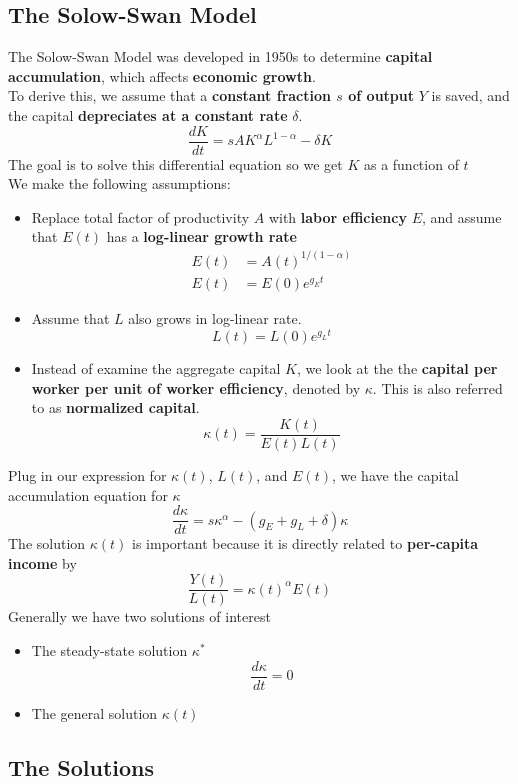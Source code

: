 \documentclass[a4paper]{article}
\renewcommand{\sb}{\vspace*{4px} \\}
\begin{document}
\subsection{The Solow-Swan Model}
The Solow-Swan Model was developed in 1950s to determine \textbf{capital accumulation}, which affects \textbf{economic growth}. \sb
To derive this, we assume that a \textbf{constant fraction $s$ of output} $Y$ is saved, and the capital \textbf{depreciates at a constant rate} $\delta$.
\begin{equation}
    \tag{Capital Accumulation Equation}
    \frac{dK}{dt} = sAK^{\alpha}L^{1-\alpha} - \delta K
\end{equation}
The goal is to solve this differential equation so we get $K$ as a function of $t$ \sb
We make the following assumptions: \begin{itemize}
    \item Replace total factor of productivity $A$ with \textbf{labor efficiency} $E$, and assume that $E(t)$ has a \textbf{log-linear growth rate}
    \begin{align*}
        E(t) &= A(t)^{1/(1-\alpha)} \\
        E(t) &= E(0)e^{g_E t}
    \end{align*}
    \item Assume that $L$ also grows in log-linear rate.
    \[ L(t) = L(0)e^{g_L t} \]
    \item Instead of examine the aggregate capital $K$, we look at the the \textbf{capital per worker per unit of worker efficiency}, denoted by $\kappa$. This 
    is also referred to as \textbf{normalized capital}.
    \[ \kappa(t) = \frac{K(t)}{E(t)L(t)} \]
\end{itemize}
Plug in our expression for $\kappa(t)$, $L(t)$, and $E(t)$, we have the capital accumulation equation for $\kappa$
\[ \frac{d\kappa}{dt} = s\kappa^\alpha - (g_E + g_L + \delta)\kappa \]
The solution $\kappa(t)$ is important because it is directly related to \textbf{per-capita income} by
\[ \frac{Y(t)}{L(t)} = \kappa(t)^\alpha E(t) \]
% 
Generally we have two solutions of interest
\begin{itemize}
    \item The steady-state solution $\kappa^*$
    \[ \frac{d\kappa}{dt} = 0 \]
    \item The general solution $\kappa(t)$
\end{itemize}


\subsection{The Solutions}
\end{document}
